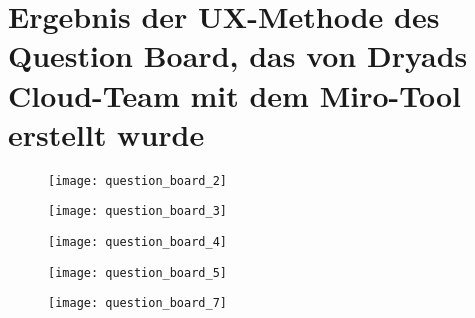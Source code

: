 \section{Ergebnis der UX-Methode des Question Board, das von Dryads Cloud-Team mit dem Miro-Tool erstellt wurde} \label{appendix:question_board}

\begin{figure}[H]
  \centering
  \texttt{[image: question\_board\_2]}
  \caption{}
  \label{fig:question_board_2}
\end{figure}
\begin{figure}[H]
  \centering
  \texttt{[image: question\_board\_3]}
  \caption{}
  \label{fig:question_board_3}
\end{figure}
\begin{figure}[H]
  \centering
  \texttt{[image: question\_board\_4]}
  \caption{}
  \label{fig:question_board_4}
\end{figure}
\begin{figure}[H]
  \centering
  \texttt{[image: question\_board\_5]}
  \caption{}
  \label{fig:question_board_5}
\end{figure}
\begin{figure}[H]
  \centering
  \texttt{[image: question\_board\_7]}
  \caption{}
  \label{fig:question_board_7}
\end{figure}